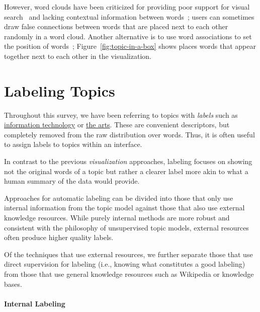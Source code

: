 However, word clouds have been criticized for providing poor support for visual
search~\citep{Viegas2008} and lacking contextual information between
words~\citep{harris11}; users can sometimes draw false connections between words
that are placed next to each other randomly in a word cloud.  Another
alternative is to use word associations to set the position of
words~\citep{Smith:Chuang:Hu:Boyd-Graber:Findlater-2014};
Figure~\ref{fig:topic-in-a-box} shows places words that appear together next to
each other in the visualization.



\section{Labeling Topics}

Throughout this survey, we have been referring to topics with \emph{labels} such as
\underline{information technology} or \underline{the arts}.  These are
convenient descriptors, but completely removed from the raw distribution over words.
Thus, it is often useful to assign labels to topics within an interface.

In contrast to the previous \emph{visualization} approaches, labeling
focuses on showing not the original words of a topic but rather a
clearer label more akin to what a human summary of the data would
provide.

Approaches for automatic labeling can be divided into those that only
use internal information from the topic model against those that also
use external knowledge resources.  While purely internal methods are
more robust and consistent with the philosophy of unsupervised topic
models, external resources often produce higher quality
labels.

Of the techniques that use external resources, we further separate
those that use direct supervision for labeling (i.e., knowing what
constitutes a good labeling) from those that use general knowledge
resources such as Wikipedia or knowledge bases.

\paragraph{Internal Labeling}

